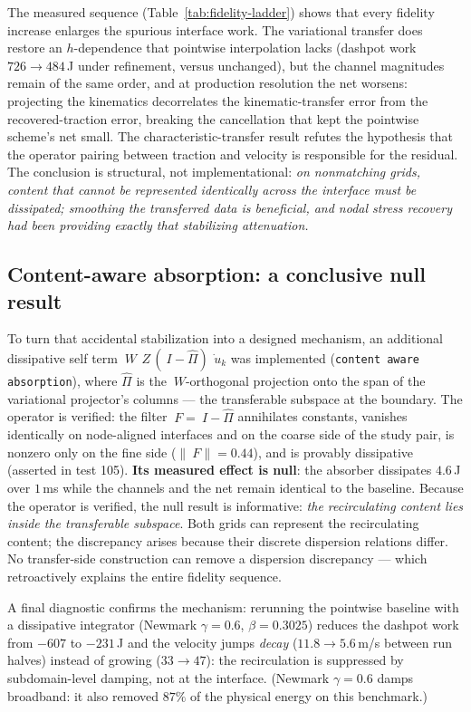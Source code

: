 \documentclass[11pt]{article}
\newcommand{\norm}[1]{\lVert #1 \rVert}
\newcommand{\code}[1]{\texttt{#1}}
\begin{document}
The measured sequence (Table~\ref{tab:fidelity-ladder}) shows that every
fidelity increase enlarges the spurious interface work. The variational
transfer does restore an $h$-dependence that pointwise interpolation lacks
(dashpot work $726 \to 484$\,J under refinement, versus unchanged), but the
channel magnitudes remain of the same order, and at production
resolution the net worsens: projecting the kinematics decorrelates the
kinematic-transfer error from the recovered-traction error, breaking the
cancellation that kept the pointwise scheme's net small. The
characteristic-transfer result refutes the hypothesis that the operator
pairing between traction and velocity is responsible for the residual. The conclusion
is structural, not implementational: \emph{on nonmatching grids, content
that cannot be represented identically across the interface must be
dissipated; smoothing the transferred data is beneficial, and nodal stress
recovery had been providing exactly that stabilizing attenuation.}

\subsection{Content-aware absorption: a conclusive null result}
\label{sec:content-aware}

To turn that accidental stabilization into a designed mechanism, an
additional dissipative self term $~W\,~Z\,(~I - \widehat\Pi)\,\dot{~u}_k$
was implemented (\code{content aware absorption}), where $\widehat\Pi$ is
the $~W$-orthogonal projection onto the span of the variational
projector's columns --- the transferable subspace at the boundary. The
operator is verified: the filter $~F = ~I - \widehat\Pi$ annihilates
constants, vanishes identically on node-aligned interfaces and on the
coarse side of the study pair, is nonzero only on the fine side
($\norm{~F} = 0.44$), and is provably dissipative (asserted in test 105). \textbf{Its measured effect is null}: the absorber dissipates
$4.6$\,J over $1$\,ms while the channels and the net remain identical to the
baseline. Because the operator is verified, the null result is informative:
\emph{the recirculating content lies inside the transferable subspace}. Both
grids can represent the recirculating content; the discrepancy arises
because their discrete dispersion relations differ. No transfer-side
construction can remove a dispersion discrepancy --- which retroactively
explains the entire fidelity sequence.

A final diagnostic confirms the mechanism: rerunning the pointwise
baseline with a dissipative integrator (Newmark $\gamma = 0.6$,
$\beta = 0.3025$) reduces the dashpot work from $-607$ to $-231$\,J and
the velocity jumps \emph{decay} ($11.8 \to 5.6$\,m/s between run halves)
instead of growing ($33 \to 47$): the recirculation is suppressed by
subdomain-level damping, not at the interface. (Newmark $\gamma = 0.6$
damps broadband: it also removed $87\%$ of the physical energy on this
benchmark.)
\end{document}
